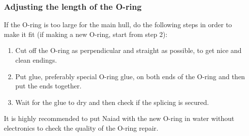 	\subsubsection*{Adjusting the length of the O-ring}
	\label{Oring} 
	\noindent If the O-ring is too large for the main hull, do the following steps in order to make it fit (if making a new O-ring, start from step 2):
	
	\begin{enumerate}
	\item Cut off the O-ring as perpendicular and straight as possible, to get nice and clean endings.
	\item Put glue, preferably special O-ring glue, on both ends of the O-ring and then put the ends together.
	\item Wait for the glue to dry and then check if the splicing is secured. 
	\end{enumerate}
	It is highly recommended to put Naiad with the new O-ring in water without electronics to check the quality of the O-ring repair.  
	